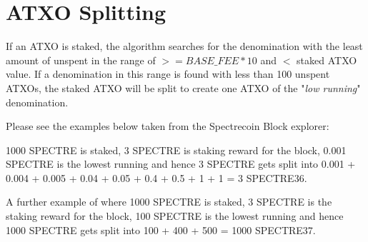 \section{ATXO Splitting} 
If an ATXO is staked, the algorithm searches for the denomination with the 
least amount of unspent in the range of  $>= BASE\_FEE * 10$ and $<$ staked 
ATXO value. If a denomination in this range is found with less than 100 
unspent ATXOs, the staked ATXO will be split to create one ATXO of the 
"\textit{low running}" denomination. 



Please see the examples below taken from the Spectrecoin Block explorer: 






1000 SPECTRE is staked, 3 SPECTRE is staking reward for the block, 0.001 SPECTRE is the lowest running and hence 3 SPECTRE gets split into 
0.001 + 0.004 + 0.005 + 0.04 + 0.05 + 0.4 + 0.5 + 1 + 1 = 3 SPECTRE36. 





A further example of where 1000 SPECTRE is staked, 3 SPECTRE is the staking reward for the block, 100 SPECTRE is the lowest running and 
hence 1000 SPECTRE gets split into 100 + 400 + 500 = 1000 SPECTRE37.
